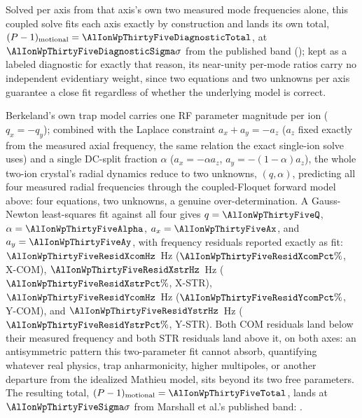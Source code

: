\documentclass[aps,pra,superscriptaddress,groupedaddress,nofootinbib]{revtex4-2}
\begin{document}
Solved per axis from that axis's own two
measured mode frequencies alone, this coupled solve fits each axis exactly
by construction and lands its own total,
$(P-1)_{\rm motional}=\AlIonWpThirtyFiveDiagnosticTotal$, at
$\AlIonWpThirtyFiveDiagnosticSigma\sigma$ from the published band
(\textit{\AlIonWpThirtyFiveDiagnosticVerdict}); kept as a labeled
diagnostic for exactly that reason, its near-unity per-mode ratios carry
no independent evidentiary weight, since two equations and two unknowns
per axis guarantee a close fit regardless of whether the underlying model
is correct.

Berkeland's own trap model carries one RF parameter magnitude per ion
($q_x=-q_y$); combined with the Laplace constraint $a_x+a_y=-a_z$ ($a_z$
fixed exactly from the measured axial frequency, the same relation the
exact single-ion solve uses) and a single DC-split fraction $\alpha$
($a_x=-\alpha a_z$, $a_y=-(1-\alpha)a_z$), the whole two-ion crystal's
radial dynamics reduce to two unknowns, $(q,\alpha)$, predicting all four
measured radial frequencies through the coupled-Floquet forward model
above: four equations, two unknowns, a genuine over-determination. A
Gauss-Newton least-squares fit against all four gives
$q=\AlIonWpThirtyFiveQ$, $\alpha=\AlIonWpThirtyFiveAlpha$,
$a_x=\AlIonWpThirtyFiveAx$, and $a_y=\AlIonWpThirtyFiveAy$, with frequency
residuals reported exactly as fit: $\AlIonWpThirtyFiveResidXcomHz$~Hz
($\AlIonWpThirtyFiveResidXcomPct\%$, X-COM), $\AlIonWpThirtyFiveResidXstrHz$~Hz
($\AlIonWpThirtyFiveResidXstrPct\%$, X-STR), $\AlIonWpThirtyFiveResidYcomHz$~Hz
($\AlIonWpThirtyFiveResidYcomPct\%$, Y-COM), and
$\AlIonWpThirtyFiveResidYstrHz$~Hz ($\AlIonWpThirtyFiveResidYstrPct\%$,
Y-STR). Both COM residuals land below their measured frequency and both
STR residuals land above it, on both axes: an antisymmetric pattern this
two-parameter fit cannot absorb, quantifying whatever real physics, trap
anharmonicity, higher multipoles, or another departure from the idealized
Mathieu model, sits beyond its two free parameters. The resulting total,
$(P-1)_{\rm motional}=\AlIonWpThirtyFiveTotal$, lands at
$\AlIonWpThirtyFiveSigma\sigma$ from Marshall et al.'s published band:
\textit{\AlIonWpThirtyFiveVerdict}.
\end{document}
